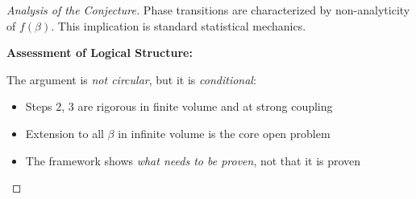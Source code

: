 \begin{proof}[Analysis of the Conjecture]
Phase transitions are characterized by non-analyticity of $f(\beta)$. This 
implication is standard statistical mechanics.

\textbf{Assessment of Logical Structure:}

The argument is \emph{not circular}, but it is \emph{conditional}:
\begin{itemize}
\item Steps 2, 3 are rigorous in finite volume and at strong coupling
\item Extension to all $\beta$ in infinite volume is the core open problem
\item The framework shows \emph{what needs to be proven}, not that it is proven
\end{itemize}
\end{proof}







